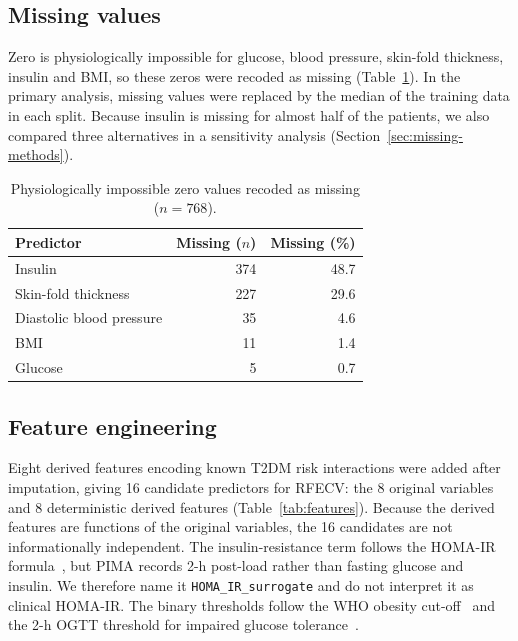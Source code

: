 \subsection{Missing values}
Zero is physiologically impossible for glucose, blood pressure, skin-fold thickness, insulin and BMI, so these zeros were recoded as missing (Table~\ref{tab:missing-counts}). In the primary analysis, missing values were replaced by the median of the training data in each split. Because insulin is missing for almost half of the patients, we also compared three alternatives in a sensitivity analysis (Section~\ref{sec:missing-methods}).

\begin{table}[!htbp]
\centering
\caption{Physiologically impossible zero values recoded as missing ($n = 768$).}
\label{tab:missing-counts}
\begin{tabular}{lrr}
\toprule
Predictor & Missing ($n$) & Missing (\%) \\
\midrule
Insulin & 374 & 48.7 \\
Skin-fold thickness & 227 & 29.6 \\
Diastolic blood pressure & 35 & 4.6 \\
BMI & 11 & 1.4 \\
Glucose & 5 & 0.7 \\
\bottomrule
\end{tabular}
\end{table}

\subsection{Feature engineering}
Eight derived features encoding known T2DM risk interactions were added after imputation, giving 16 candidate predictors for RFECV: the 8 original variables and 8 deterministic derived features (Table~\ref{tab:features}). Because the derived features are functions of the original variables, the 16 candidates are not informationally independent. The insulin-resistance term follows the HOMA-IR formula~\cite{matthews1985homa}, but PIMA records 2-h post-load rather than fasting glucose and insulin. We therefore name it \texttt{HOMA\_IR\_surrogate} and do not interpret it as clinical HOMA-IR. The binary thresholds follow the WHO obesity cut-off~\cite{who2000obesity} and the 2-h OGTT threshold for impaired glucose tolerance~\cite{ada2024}.

